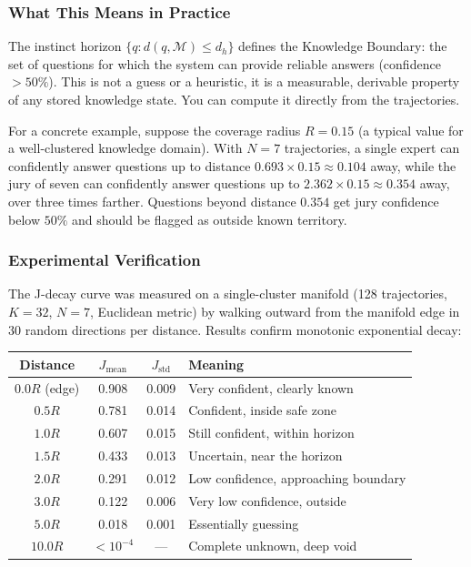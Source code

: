 \documentclass[11pt]{article}
\begin{document}
\subsubsection*{What This Means in Practice}

The instinct horizon $\{q : d(q, \mathcal{M}) \le d_h\}$ defines the
Knowledge Boundary: the set of questions for which the system can
provide reliable answers (confidence $>50\%$). This is not a guess or a
heuristic, it is a measurable, derivable property of any stored
knowledge state. You can compute it directly from the trajectories.

For a concrete example, suppose the coverage radius $R = 0.15$ (a typical
value for a well-clustered knowledge domain). With $N=7$ trajectories,
a single expert can confidently answer questions up to distance
$0.693 \times 0.15 \approx 0.104$ away, while the jury of seven can
confidently answer questions up to $2.362 \times 0.15 \approx 0.354$
away, over three times farther. Questions beyond distance $0.354$ get
jury confidence below $50\%$ and should be flagged as outside known
territory.

\subsubsection*{Experimental Verification}

The J-decay curve was measured on a single-cluster manifold (128 trajectories, $K=32$, $N=7$, Euclidean metric) by walking outward from the manifold edge in 30 random directions per distance. Results confirm monotonic exponential decay:

\begin{center}
\begin{tabular}{c c c l}
\toprule
Distance & $J_{\text{mean}}$ & $J_{\text{std}}$ & Meaning \\
\midrule
$0.0R$ (edge) & 0.908 & 0.009 & Very confident, clearly known \\
$0.5R$ & 0.781 & 0.014 & Confident, inside safe zone \\
$1.0R$ & 0.607 & 0.015 & Still confident, within horizon \\
$1.5R$ & 0.433 & 0.013 & Uncertain, near the horizon \\
$2.0R$ & 0.291 & 0.012 & Low confidence, approaching boundary \\
$3.0R$ & 0.122 & 0.006 & Very low confidence, outside \\
$5.0R$ & 0.018 & 0.001 & Essentially guessing \\
$10.0R$ & $<10^{-4}$ & --- & Complete unknown, deep void \\
\bottomrule
\end{tabular}
\end{center}
\end{document}
